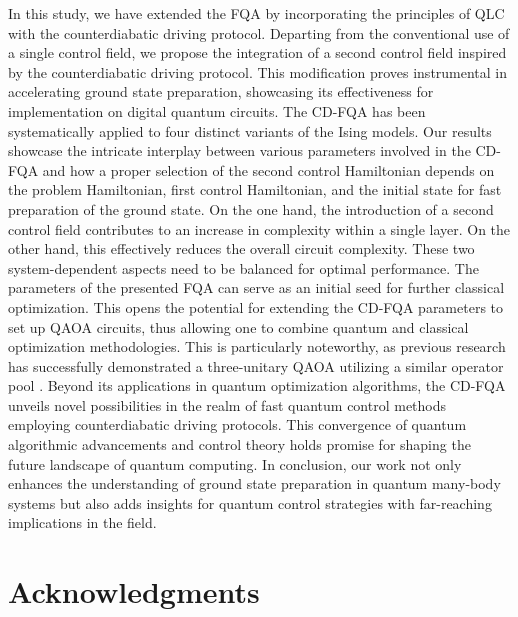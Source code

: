 \documentclass[twocolumn,aps,superscriptaddress,floatfix,longbibliography]{revtex4-2}
\begin{document}
In this study, we have extended the FQA by incorporating the
principles of QLC  with the counterdiabatic driving protocol.
Departing from the conventional use of a single control field,
we propose the integration of a second control field inspired by
the counterdiabatic driving protocol. This modification proves
instrumental in accelerating ground state preparation,
showcasing its effectiveness for implementation on digital
quantum circuits. The CD-FQA has been systematically applied to
four distinct variants of the Ising models. Our results showcase
the intricate interplay between various parameters involved in
the CD-FQA and how a proper selection of the second control
Hamiltonian depends on the problem Hamiltonian, first control
Hamiltonian, and the initial state for fast preparation of the
ground state. On the one hand, %
the introduction of a second
control field contributes to an increase in complexity within a single layer. On the other hand, this %
effectively reduces the overall circuit complexity.  
These two system-dependent aspects need to be
balanced for optimal performance.
The parameters of the presented FQA can serve
as an initial seed for further classical optimization.
This opens the
potential for extending the CD-FQA parameters to set up QAOA
circuits, thus allowing one to combine %
quantum and classical
optimization methodologies. This is particularly noteworthy, as
previous research has successfully demonstrated a three-unitary
QAOA utilizing a similar operator pool
\cite{chandarana2022digitized}. Beyond its applications in
quantum optimization algorithms, the CD-FQA unveils novel
possibilities in the realm of fast quantum control methods
employing counterdiabatic driving protocols. This convergence of quantum algorithmic advancements and control theory holds
promise for shaping the future landscape of quantum computing.
In conclusion, our work not only enhances the understanding of
ground state preparation in quantum many-body systems but also
adds insights for quantum control strategies with far-reaching
implications in the field.

\section{Acknowledgments}
\end{document}
